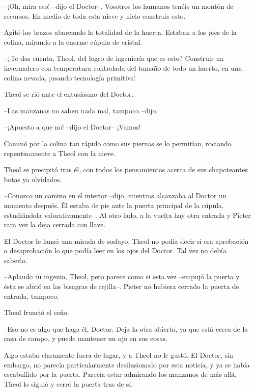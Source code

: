 --¡Oh, mira eso! --dijo el Doctor--. Vosotros los humanos tenéis un montón de recursos. En medio de toda esta nieve y hielo construís esto. 

Agitó los brazos abarcando la totalidad de la huerta. Estaban a los pies de la colina, mirando a la enorme cúpula de cristal.

--¿Te das cuenta, Theol, del logro de ingeniería que es esto? Construir un invernadero con temperatura controlada del tamaño de todo un huerto, en una colina nevada, ¡usando tecnología primitiva!



Theol se rió ante el entusiasmo del Doctor.

 --Las manzanas no saben nada mal, tampoco --dijo.



--¡Apuesto a que no! --dijo el Doctor-- ¡Vamos!



Caminó por la colina tan rápido como sus piernas se lo permitían, rociando repentinamente a Theol con la nieve.



Theol se precipitó tras él, con todos los pensamientos acerca de sus chapoteantes botas ya olvidados.

--Conozco un camino en el interior --dijo, mientras alcanzaba al Doctor un momento después. Él estaba de pie ante la puerta principal de la cúpula, estudiándola valorativamente--. Al otro lado, a la vuelta hay otra entrada y Pieter rara vez la deja cerrada con llave.



El Doctor le lanzó una mirada de soslayo. Theol no podía decir si era aprobación o desaprobación lo que podía leer en los ojos del Doctor. Tal vez no debía saberlo.

 --Aplaudo tu ingenio, Theol, pero parece como si esta vez --empujó la puerta y ésta se abrió en las bisagras de rejilla--. Pieter no hubiera cerrado la puerta de entrada, tampoco.



Theol frunció el ceño.

--Eso no es algo que haga él, Doctor. Deja la otra abierta, ya que está cerca de la casa de campo, y puede mantener un ojo en sus cosas.



Algo estaba claramente fuera de lugar, y a Theol no le gustó. El Doctor, sin embargo, no parecía particularmente desilusionado por esta noticia, y ya se había escabullido por la puerta. Parecía estar admirando los manzanos de más allá. Theol lo siguió y cerró la puerta tras de sí.



